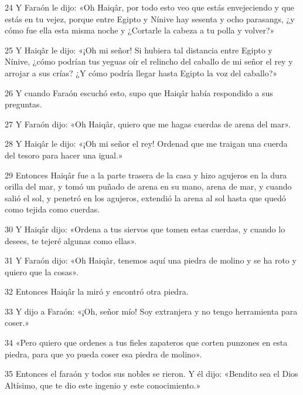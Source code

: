 \par 24 Y Faraón le dijo: «Oh Haiqâr, por todo esto veo que estás envejeciendo y que estás en tu vejez, porque entre Egipto y Nínive hay sesenta y ocho parasangs, ¿y cómo fue ella esta misma noche y ¿Cortarle la cabeza a tu polla y volver?»

\par 25 Y Haiqâr le dijo: «¡Oh mi señor! Si hubiera tal distancia entre Egipto y Nínive, ¿cómo podrían tus yeguas oír el relincho del caballo de mi señor el rey y arrojar a sus crías? ¿Y cómo podría llegar hasta Egipto la voz del caballo?»

\par 26 Y cuando Faraón escuchó esto, supo que Haiqâr había respondido a sus preguntas.

\par 27 Y Faraón dijo: «Oh Haiqâr, quiero que me hagas cuerdas de arena del mar».

\par 28 Y Haiqâr le dijo: «¡Oh mi señor el rey! Ordenad que me traigan una cuerda del tesoro para hacer una igual.»

\par 29 Entonces Haiqâr fue a la parte trasera de la casa y hizo agujeros en la dura orilla del mar, y tomó un puñado de arena en su mano, arena de mar, y cuando salió el sol, y penetró en los agujeros, extendió la arena al sol hasta que quedó como tejida como cuerdas.

\par 30 Y Haiqâr dijo: «Ordena a tus siervos que tomen estas cuerdas, y cuando lo desees, te tejeré algunas como ellas».

\par 31 Y Faraón dijo: «Oh Haiqâr, tenemos aquí una piedra de molino y se ha roto y quiero que la cosas».

\par 32 Entonces Haiqâr la miró y encontró otra piedra.

\par 33 Y dijo a Faraón: «¡Oh, señor mío! Soy extranjera y no tengo herramienta para coser.»

\par 34 «Pero quiero que ordenes a tus fieles zapateros que corten punzones en esta piedra, para que yo pueda coser esa piedra de molino».

\par 35 Entonces el faraón y todos sus nobles se rieron. Y él dijo: «Bendito sea el Dios Altísimo, que te dio este ingenio y este conocimiento.»

